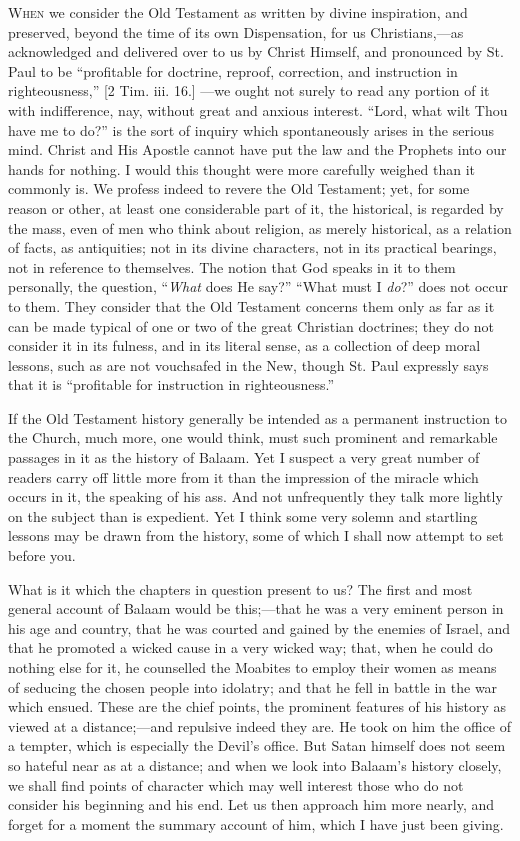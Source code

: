 W\textsc{hen} we consider the Old Testament as written by divine
inspiration, and preserved, beyond the time of its own Dispensation,
for us Christians,—as acknowledged and delivered over to us by
Christ Himself, and pronounced by St. Paul to be ``profitable for
doctrine, reproof, correction, and instruction in righteousness,''
[2 Tim. iii. 16.] —we ought not surely to read any portion of it
with indifference, nay, without great and anxious interest.
``Lord, what wilt Thou have me to do?'' is the sort of inquiry
which spontaneously arises in the serious mind. Christ and His Apostle
cannot have put the law and the Prophets into our hands for nothing. I
would this thought were more carefully weighed than it commonly is. We
profess indeed to revere the Old Testament; yet, for some reason or
other, at least one considerable part of it, the historical, is
regarded by the mass, even of men who think about religion, as merely
historical, as a relation of facts, as antiquities; not in its divine
characters, not in its practical bearings, not in reference to
themselves. The notion that God speaks in it to them personally, the
question, ``\emph{What} does He say?'' ``What must I \emph{do}?''
does not occur to them. They consider that the Old Testament concerns
them only as far as it can be made typical of one or two of the great
Christian doctrines; they do not consider it in its fulness, and in
its literal sense, as a collection of deep moral lessons, such as are
not vouchsafed in the New, though St. Paul expressly says that it is
``profitable for instruction in righteousness.''

If the Old Testament history generally be intended as a permanent
instruction to the Church, much more, one would think, must such
prominent and remarkable passages in it as the history of Balaam. Yet
I suspect a very great number of readers carry off little more from it
than the impression of the miracle which occurs in it, the speaking of
his ass. And not unfrequently they talk more lightly on the subject
than is expedient. Yet I think some very solemn and startling lessons
may be drawn from the history, some of which I shall now attempt to
set before you.

What is it which the chapters in question present to us? The first
and most general account of Balaam would be this;—that he was a very
eminent person in his age and country, that he was courted and gained
by the enemies of Israel, and that he promoted a wicked cause in a
very wicked way; that, when he could do nothing else for it, he
counselled the Moabites to employ their women as means of seducing the
chosen people into idolatry; and that he fell in battle in the war
which ensued. These are the chief points, the prominent features of
his history as viewed at a distance;—and repulsive indeed they are.
He took on him the office of a tempter, which is especially the
Devil's office. But Satan himself does not seem so hateful near as at
a distance; and when we look into Balaam's history closely, we shall
find points of character which may well interest those who do not
consider his beginning and his end. Let us then approach him more
nearly, and forget for a moment the summary account of him, which I
have just been giving.


